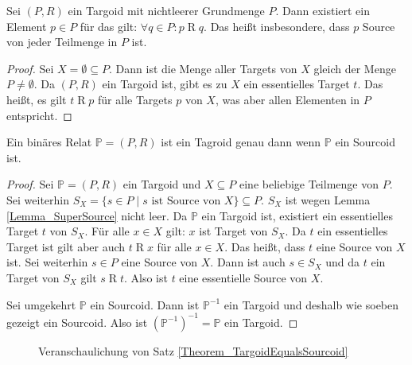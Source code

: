 \documentclass{article}
\begin{document}
\begin{lemma}\label{Lemma_SuperSource}
  Sei $(P, R)$ ein Targoid mit nichtleerer Grundmenge $P$.
  Dann existiert ein Element $p \in P$ für das gilt: $\forall q \in P \colon p \mathrel{R} q$.
  Das heißt insbesondere, dass $p$ Source von jeder Teilmenge in $P$ ist.
\end{lemma}
\begin{proof}
  Sei $X = \emptyset \subseteq P$. Dann ist die Menge aller Targets von $X$ gleich der Menge $P \neq \emptyset$.
  Da $(P, R)$ ein Targoid ist, gibt es zu $X$ ein essentielles Target $t$.
  Das heißt, es gilt $t \mathrel{R} p$ für alle Targets $p$ von $X$, was aber allen Elementen in $P$ entspricht.
\end{proof}

\begin{theorem}\label{Theorem_TargoidEqualsSourcoid}
  Ein binäres Relat $\mathbb{P} = (P, R)$ ist ein Tagroid genau dann wenn
  $\mathbb{P}$ ein Sourcoid ist.
\end{theorem}
\begin{proof}
  Sei $\mathbb{P} = (P, R)$ ein Targoid und $X \subseteq P$ eine beliebige Teilmenge von $P$.
  Sei weiterhin $S_X = \{s \in P \mid s \text{ ist Source von } X\} \subseteq P$.
  $S_X$ ist wegen Lemma \ref{Lemma_SuperSource} nicht leer.
  Da $\mathbb{P}$ ein Targoid ist, existiert ein essentielles Target $t$ von $S_X$.
  Für alle $x \in X$ gilt: $x$ ist Target von $S_X$.
  Da $t$ ein essentielles Target ist gilt aber auch $t \mathrel{R} x$ für alle $x \in X$.
  Das heißt, dass $t$ eine Source von $X$ ist.
  Sei weiterhin $s \in P$ eine Source von $X$.
  Dann ist auch $s \in S_X$ und da $t$ ein Target von $S_X$ gilt $s \mathrel{R} t$.
  Also ist $t$ eine essentielle Source von $X$.

  Sei umgekehrt $\mathbb{P}$ ein Sourcoid.
  Dann ist $\mathbb{P}^{-1}$ ein Targoid und deshalb wie soeben gezeigt ein Sourcoid.
  Also ist $(\mathbb{P}^{-1})^{-1} = \mathbb{P}$ ein Targoid.
\end{proof}

\begin{figure}
  \caption{Veranschaulichung von Satz \ref{Theorem_TargoidEqualsSourcoid}}
  \label{fig:TargoidSourcoid}
\end{figure}
\end{document}
